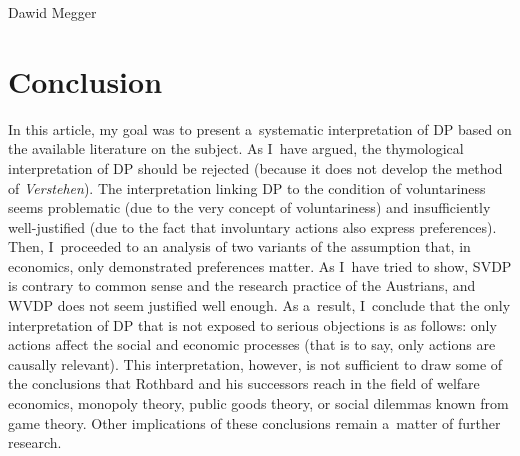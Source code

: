 \begin{artengenv}{Dawid Megger}
\section{Conclusion}

In this article, my goal was to present a~systematic interpretation of DP based on the available literature on the subject. As I~have argued, the thymological interpretation of DP should be rejected (because it does not develop the method of \textit{Verstehen}). The interpretation linking DP to the condition of voluntariness seems problematic (due to the very concept of voluntariness) and insufficiently well-justified (due to the fact that involuntary actions also express preferences). Then, I~proceeded to an analysis of two variants of the assumption that, in economics, only demonstrated preferences matter. As I~have tried to show, SVDP is contrary to common sense and the research practice of the Austrians, and WVDP does not seem justified well enough. As a~result, I~conclude that the only interpretation of DP that is not exposed to serious objections is as follows: only actions affect the social and economic processes (that is to say, only actions are causally relevant). This interpretation, however, is not sufficient to draw some of the conclusions that Rothbard and his successors reach in the field of welfare economics, monopoly theory, public goods theory, or social dilemmas known from game theory. Other implications of these conclusions remain a~matter of further research.



\end{artengenv}

\label{megger-last}